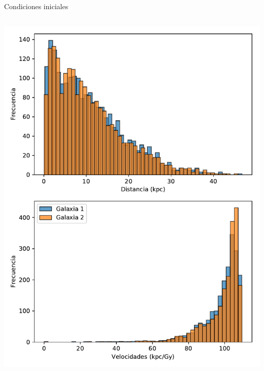 \documentclass{beamer}
\begin{document}
\begin{frame}{Condiciones iniciales}
\begin{columns}
\begin{column}{0.65\textwidth}
			\includegraphics[height=0.75\textheight]{sources/images/galaxy_distribution.pdf}\\
		\end{column}
	\end{columns}
\end{frame}
\end{document}
